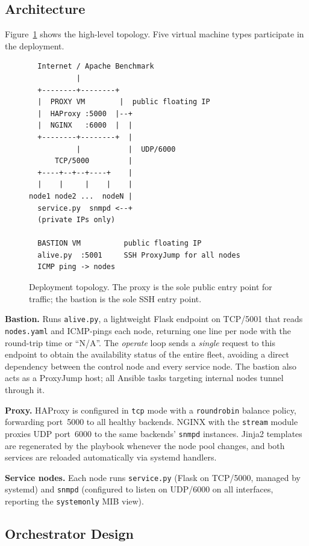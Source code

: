 \documentclass[conference]{IEEEtran}
\begin{document}
\subsection{Architecture}

Figure~\ref{fig:arch} shows the high-level topology.  Five virtual
machine types participate in the deployment.

\begin{figure}[ht]
\centering
\begin{verbatim}
  Internet / Apache Benchmark
           |
  +--------+--------+
  |  PROXY VM        |  public floating IP
  |  HAProxy :5000  |--+
  |  NGINX   :6000  |  |
  +--------+--------+  |
           |           |  UDP/6000
      TCP/5000         |
  +----+--+--+----+    |
  |    |     |    |    |
node1 node2 ...  nodeN |
  service.py  snmpd <--+
  (private IPs only)

  BASTION VM          public floating IP
  alive.py  :5001     SSH ProxyJump for all nodes
  ICMP ping -> nodes
\end{verbatim}
\caption{Deployment topology. The proxy is the sole public entry
  point for traffic; the bastion is the sole SSH entry point.}
\label{fig:arch}
\end{figure}

\textbf{Bastion.}
Runs \texttt{alive.py}, a lightweight Flask endpoint on TCP/5001 that
reads \texttt{nodes.yaml} and ICMP-pings each node, returning one
line per node with the round-trip time or ``N/A''.  The \emph{operate}
loop sends a \emph{single} request to this endpoint to obtain the
availability status of the entire fleet, avoiding a direct dependency
between the control node and every service node.  The bastion also
acts as a ProxyJump host; all Ansible tasks targeting internal nodes
tunnel through it.

\textbf{Proxy.}
HAProxy is configured in \texttt{tcp} mode with a \texttt{roundrobin}
balance policy, forwarding port~5000 to all healthy backends.  NGINX
with the \texttt{stream} module proxies UDP port~6000 to the same
backends' \texttt{snmpd} instances.  Jinja2 templates are regenerated
by the playbook whenever the node pool changes, and both services are
reloaded automatically via systemd handlers.

\textbf{Service nodes.}
Each node runs \texttt{service.py} (Flask on TCP/5000, managed by
systemd) and \texttt{snmpd} (configured to listen on UDP/6000 on all
interfaces, reporting the \texttt{systemonly} MIB view).

\subsection{Orchestrator Design}
\end{document}
